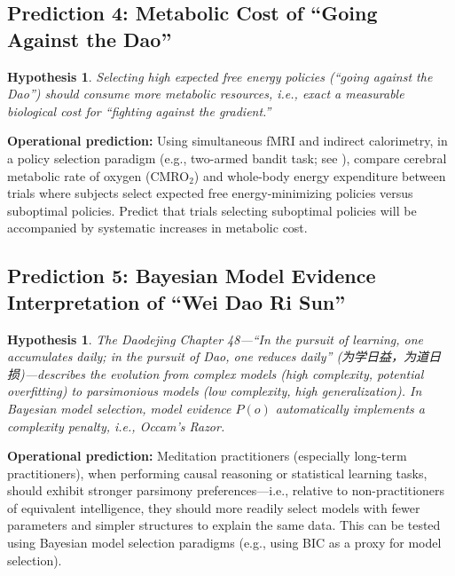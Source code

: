 \documentclass[11pt,a4paper]{article}
\newtheorem{hypothesis}[proposition]{Hypothesis}
\begin{document}
\subsection{Prediction 4: Metabolic Cost of ``Going Against the Dao''}

\begin{hypothesis}
Selecting high expected free energy policies (``going against the Dao'') should consume more metabolic resources, i.e., exact a measurable biological cost for ``fighting against the gradient.''
\end{hypothesis}

\textbf{Operational prediction:} Using simultaneous fMRI and indirect calorimetry, in a policy selection paradigm (e.g., two-armed bandit task; see \cite{Schwartenbeck2015}), compare cerebral metabolic rate of oxygen (CMRO$_2$) and whole-body energy expenditure between trials where subjects select expected free energy-minimizing policies versus suboptimal policies. Predict that trials selecting suboptimal policies will be accompanied by systematic increases in metabolic cost.

\subsection{Prediction 5: Bayesian Model Evidence Interpretation of ``Wei Dao Ri Sun''}

\begin{hypothesis}
The \textit{Daodejing} Chapter 48---``In the pursuit of learning, one accumulates daily; in the pursuit of Dao, one reduces daily'' (为学日益，为道日损)---describes the evolution from complex models (high complexity, potential overfitting) to parsimonious models (low complexity, high generalization). In Bayesian model selection, model evidence $P(o)$ automatically implements a complexity penalty, i.e., Occam's Razor.
\end{hypothesis}

\textbf{Operational prediction:} Meditation practitioners (especially long-term practitioners), when performing causal reasoning or statistical learning tasks, should exhibit stronger parsimony preferences---i.e., relative to non-practitioners of equivalent intelligence, they should more readily select models with fewer parameters and simpler structures to explain the same data. This can be tested using Bayesian model selection paradigms (e.g., using BIC as a proxy for model selection).

\end{document}

